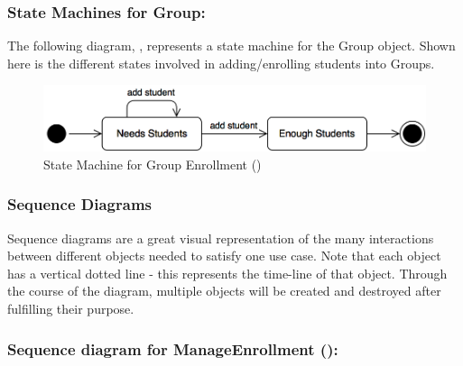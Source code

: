 \documentclass[12pt,letterpaper]{article}
\begin{document}
\subsubsection*{State Machines for Group:}

The following diagram, , represents a state machine for the Group object. Shown here is the different states involved in adding/enrolling students into Groups.

\begin{figure}[H]
	\centering{}
	\includegraphics[scale=0.3]{imgs/state/group-enrollment.png}
	\caption[ - State Machine for Group Enrollment]{State Machine for Group Enrollment ()}
\end{figure}

\subsubsection*{Sequence Diagrams}

Sequence diagrams are a great visual representation of the many interactions between different objects needed to satisfy one use case. Note that
each object has a vertical dotted line - this represents the time-line of that object. Through the course of the diagram, multiple objects will be created
and destroyed after fulfilling their purpose.

\newpage{}

\subsubsection*{Sequence diagram for ManageEnrollment ():}
\end{document}
